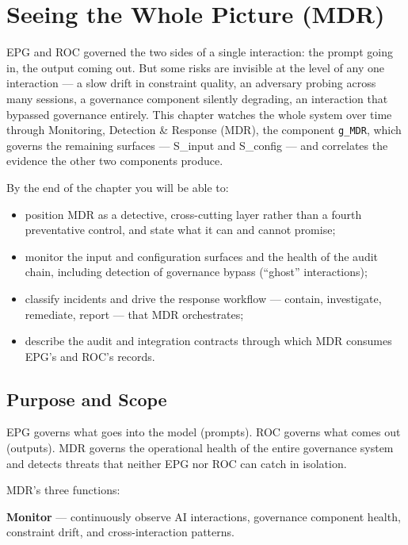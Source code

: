 \chapter{Seeing the Whole Picture (MDR)}
\label{ch:monitoring}


EPG and ROC governed the two sides of a single interaction: the prompt going in, the output coming out. But some risks are invisible at the level of any one interaction --- a slow drift in constraint quality, an adversary probing across many sessions, a governance component silently degrading, an interaction that bypassed governance entirely. This chapter watches the whole system over time through Monitoring, Detection \& Response (MDR), the component \texttt{g\_\allowbreak{}MDR}, which governs the remaining surfaces --- S\_\allowbreak{}input and S\_\allowbreak{}config --- and correlates the evidence the other two components produce.

By the end of the chapter you will be able to:

\begin{itemize}
  \item position MDR as a detective, cross-cutting layer rather than a fourth preventative control, and state what it can and cannot promise;
  \item monitor the input and configuration surfaces and the health of the audit chain, including detection of governance bypass (``ghost'' interactions);
  \item classify incidents and drive the response workflow --- contain, investigate, remediate, report --- that MDR orchestrates;
  \item describe the audit and integration contracts through which MDR consumes EPG's and ROC's records.
\end{itemize}


\section{Purpose and Scope}
\label{sec:monitoring-1}


EPG governs what goes into the model (prompts). ROC governs what comes out (outputs). MDR governs the operational health of the entire governance system and detects threats that neither EPG nor ROC can catch in isolation.

MDR's three functions:

\textbf{Monitor} --- continuously observe AI interactions, governance component health, constraint drift, and cross-interaction patterns.

